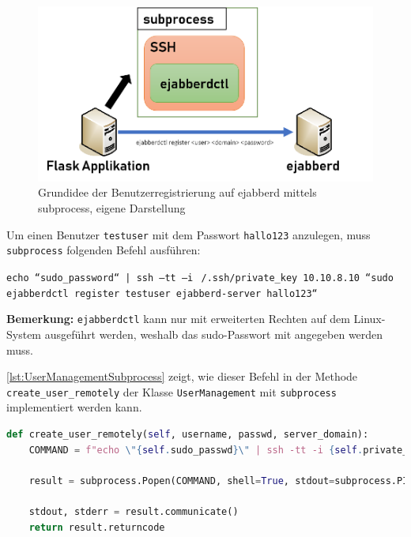 \documentclass[a4paper,titlepage,halfparskip,12pt]{scrreprt}
\begin{document}
\begin{onehalfspacing}
\begin{figure}[h]
	\centering
	\includegraphics[width=.8\linewidth]{images/subprocessSSH}
	\caption{Grundidee der Benutzerregistrierung auf ejabberd mittels subprocess, eigene Darstellung}
	\label{img:subprocesSSH}
\end{figure}

\pagebreak

Um einen Benutzer \texttt{testuser} mit dem Passwort \texttt{hallo123} anzulegen, muss \texttt{subprocess} folgenden Befehl ausführen:

\texttt{echo “sudo\_password“ | ssh –tt –i $~$/.ssh/private\_key 10.10.8.10 “sudo ejabberdctl register testuser ejabberd-server hallo123“
}

\textbf{Bemerkung:} \texttt{ejabberdctl} kann nur mit erweiterten Rechten auf dem Linux-System ausgeführt werden, weshalb das sudo-Passwort mit angegeben werden muss.

\autoref{lst:UserManagementSubprocess} zeigt, wie dieser Befehl in der Methode \texttt{create\_user\_remotely} der Klasse \texttt{UserManagement} mit \texttt{subprocess} implementiert werden kann.

\begin{lstlisting}[language=python, caption={Methode create\_user\_remotely der Klasse UserManagement}, label={lst:UserManagementSubprocess}]
def create_user_remotely(self, username, passwd, server_domain):
    COMMAND = f"echo \"{self.sudo_passwd}\" | ssh -tt -i {self.private_key} {self.host} \"sudo ejabberdctl register {username} {server_domain} {passwd}\""

    result = subprocess.Popen(COMMAND, shell=True, stdout=subprocess.PIPE, stderr=subprocess.PIPE)

    stdout, stderr = result.communicate()
    return result.returncode
\end{lstlisting}


\end{onehalfspacing}
\end{document}
